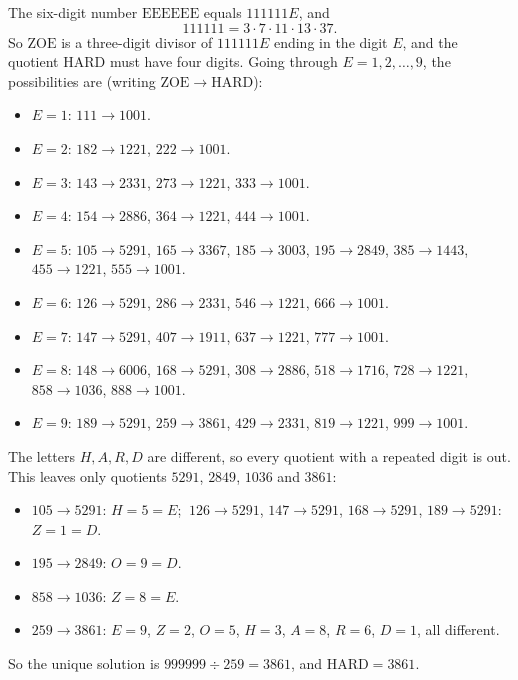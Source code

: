 The six-digit number $\mathrm{EEEEEE}$ equals $111111E$, and
\[
111111=3\cdot7\cdot11\cdot13\cdot37 .
\]
So $\mathrm{ZOE}$ is a three-digit divisor of $111111E$ ending in the digit $E$, and the quotient $\mathrm{HARD}$ must have four digits. Going through $E=1,2,\dots,9$, the possibilities are (writing $\mathrm{ZOE}\to\mathrm{HARD}$):
\begin{itemize}
\item $E=1$: $111\to1001$.
\item $E=2$: $182\to1221$, $222\to1001$.
\item $E=3$: $143\to2331$, $273\to1221$, $333\to1001$.
\item $E=4$: $154\to2886$, $364\to1221$, $444\to1001$.
\item $E=5$: $105\to5291$, $165\to3367$, $185\to3003$, $195\to2849$, $385\to1443$, $455\to1221$, $555\to1001$.
\item $E=6$: $126\to5291$, $286\to2331$, $546\to1221$, $666\to1001$.
\item $E=7$: $147\to5291$, $407\to1911$, $637\to1221$, $777\to1001$.
\item $E=8$: $148\to6006$, $168\to5291$, $308\to2886$, $518\to1716$, $728\to1221$, $858\to1036$, $888\to1001$.
\item $E=9$: $189\to5291$, $259\to3861$, $429\to2331$, $819\to1221$, $999\to1001$.
\end{itemize}
The letters $H,A,R,D$ are different, so every quotient with a repeated digit is out. This leaves only quotients $5291$, $2849$, $1036$ and $3861$:
\begin{itemize}
\item $105\to5291$: $H=5=E$; $\ 126\to5291$, $147\to5291$, $168\to5291$, $189\to5291$: $Z=1=D$.
\item $195\to2849$: $O=9=D$.
\item $858\to1036$: $Z=8=E$.
\item $259\to3861$: $E=9$, $Z=2$, $O=5$, $H=3$, $A=8$, $R=6$, $D=1$, all different.
\end{itemize}
So the unique solution is $999999\div259=3861$, and $\mathrm{HARD}=\boxed{3861}$.
